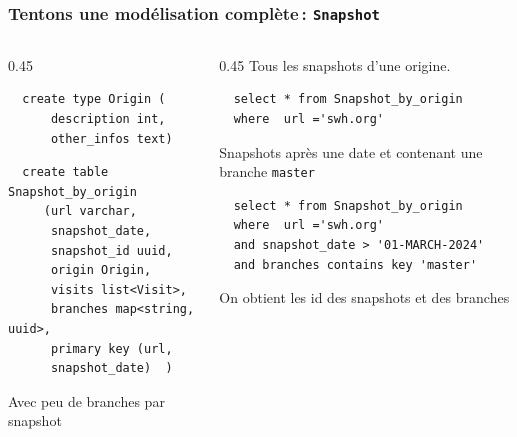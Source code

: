\begin{frame}[fragile] \frametitle{Tentons une modélisation complète\,: \texttt{Snapshot}}


\begin{columns}
    \begin{column}{0.45\textwidth}
     
  \begin{verbatim}
  create type Origin (
      description int,
      other_infos text)
  \end{verbatim}
    
    \vfill
  \begin{verbatim}
  create table Snapshot_by_origin
     (url varchar, 
      snapshot_date,
      snapshot_id uuid,
      origin Origin,
      visits list<Visit>,
      branches map<string, uuid>,
      primary key (url, 
      snapshot_date)  )
  \end{verbatim}
  Avec peu de branches par snapshot
   \end{column}
 \begin{column}{0.45\textwidth}
  Tous les snapshots d'une origine.
  
  \vfill
  
  \begin{verbatim}
  select * from Snapshot_by_origin 
  where  url ='swh.org'
  \end{verbatim}
  
   \vfill
   Snapshots après une date et contenant une branche \texttt{master}
   
 \begin{verbatim}
  select * from Snapshot_by_origin 
  where  url ='swh.org'
  and snapshot_date > '01-MARCH-2024'
  and branches contains key 'master'
  \end{verbatim}

\vfill 
  On obtient les id des snapshots et des branches
\end{column}
\end{columns}
	
\end{frame}
	

